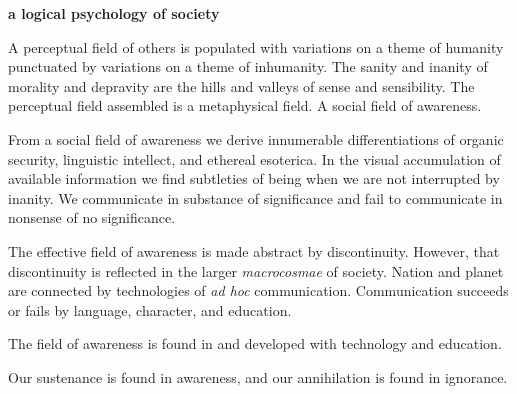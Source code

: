 

{\bf a logical psychology of society}

A perceptual field of others is populated with variations on a theme
of humanity punctuated by variations on a theme of inhumanity.  The
sanity and inanity of morality and depravity are the hills and valleys
of sense and sensibility.  The perceptual field assembled is a
metaphysical field.  A social field of awareness.

From a social field of awareness we derive innumerable
differentiations of organic security, linguistic intellect, and
ethereal esoterica.  In the visual accumulation of available
information we find subtleties of being when we are not interrupted by
inanity.  We communicate in substance of significance and fail to
communicate in nonsense of no significance.

The effective field of awareness is made abstract by discontinuity.
However, that discontinuity is reflected in the larger {\it
macrocosmae} of society.  Nation and planet are connected by
technologies of {\it ad hoc} communication.  Communication succeeds or
fails by language, character, and education.

The field of awareness is found in and developed with technology and
education.

Our sustenance is found in awareness, and our annihilation is found in
ignorance.

\bye
